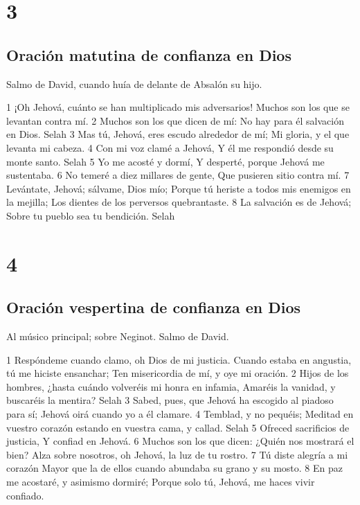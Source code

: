 \chapter{3}

\section*{Oración matutina de confianza en Dios}

Salmo de David, cuando huía de delante de Absalón su hijo.

1 ¡Oh Jehová, cuánto se han multiplicado mis adversarios!
Muchos son los que se levantan contra mí.
2 Muchos son los que dicen de mí:
No hay para él salvación en Dios. Selah
3 Mas tú, Jehová, eres escudo alrededor de mí;
Mi gloria, y el que levanta mi cabeza.
4 Con mi voz clamé a Jehová,
Y él me respondió desde su monte santo. Selah
5 Yo me acosté y dormí,
Y desperté, porque Jehová me sustentaba.
6 No temeré a diez millares de gente,
Que pusieren sitio contra mí.
7 Levántate, Jehová; sálvame, Dios mío;
Porque tú heriste a todos mis enemigos en la mejilla;
Los dientes de los perversos quebrantaste.
8 La salvación es de Jehová;
Sobre tu pueblo sea tu bendición. Selah

\chapter{4}

\section*{Oración vespertina de confianza en Dios}

Al músico principal; sobre Neginot. Salmo de David.

1 Respóndeme cuando clamo, oh Dios de mi justicia.
Cuando estaba en angustia, tú me hiciste ensanchar;
Ten misericordia de mí, y oye mi oración.
2 Hijos de los hombres, ¿hasta cuándo volveréis mi honra en infamia,
Amaréis la vanidad, y buscaréis la mentira? Selah
3 Sabed, pues, que Jehová ha escogido al piadoso para sí;
Jehová oirá cuando yo a él clamare.
4 Temblad, y no pequéis;
Meditad en vuestro corazón estando en vuestra cama, y callad. Selah
5 Ofreced sacrificios de justicia,
Y confiad en Jehová.
6 Muchos son los que dicen: ¿Quién nos mostrará el bien?
Alza sobre nosotros, oh Jehová, la luz de tu rostro.
7 Tú diste alegría a mi corazón
Mayor que la de ellos cuando abundaba su grano y su mosto.
8 En paz me acostaré, y asimismo dormiré;
Porque solo tú, Jehová, me haces vivir confiado.

